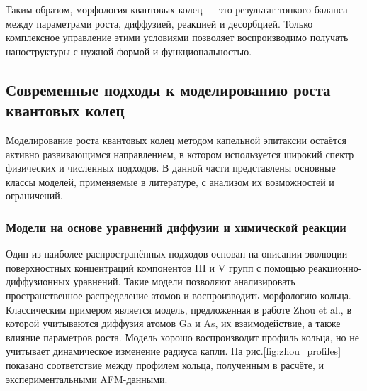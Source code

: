 \documentclass[14pt,oneside]{extarticle}
\begin{document}
Таким образом, морфология квантовых колец — это результат тонкого баланса между параметрами роста, диффузией, реакцией и десорбцией. Только комплексное управление этими условиями позволяет воспроизводимо получать наноструктуры с нужной формой и функциональностью.

\subsection{Современные подходы к моделированию роста квантовых колец}

Моделирование роста квантовых колец методом капельной эпитаксии остаётся активно развивающимся направлением, в котором используется широкий спектр физических и численных подходов. В данной части представлены основные классы моделей, применяемые в литературе, с анализом их возможностей и ограничений.

\subsubsection*{Модели на основе уравнений диффузии и химической реакции}
Один из наиболее распространённых подходов основан на описании эволюции поверхностных концентраций компонентов III и V групп с помощью реакционно-диффузионных уравнений. Такие модели позволяют анализировать пространственное распределение атомов и воспроизводить морфологию кольца. Классическим примером является модель, предложенная в работе Zhou et al.\cite{zhou2013}, в которой учитываются диффузия атомов Ga и As, их взаимодействие, а также влияние параметров роста. Модель хорошо воспроизводит профиль кольца, но не учитывает динамическое изменение радиуса капли. На рис.\ref{fig:zhou_profiles} показано соответствие между профилем кольца, полученным в расчёте, и экспериментальными AFM-данными.
\end{document}

